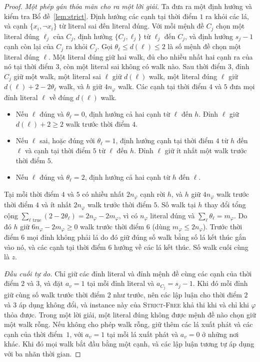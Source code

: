 \documentclass[pdflatex,sn-mathphys-num]{sn-jnl}
\theoremstyle{thmstyleone}
\theoremstyle{thmstyletwo}
\theoremstyle{thmstylethree}
\newcommand{\SFREE}{\textup{\textsc{Strict-Free}}}
\begin{document}
\begin{proof}
\emph{Một phép gán thỏa mãn cho ra một lời giải.} Ta đưa ra một định hướng và kiểm tra Bổ đề~\ref{lem:strict}. Định hướng các cạnh tại thời điểm $1$ ra khỏi các lá, và cạnh $\{x_i,\lnot x_i\}$ từ literal sai đến literal đúng. Với mỗi mệnh đề $C_j$ chọn một literal đúng $\ell_j$ của $C_j$, định hướng $\{C_j,\ell_j\}$ từ $\ell_j$ đến $C_j$, và định hướng $s_j-1$ cạnh còn lại của $C_j$ ra khỏi $C_j$. Gọi $\theta_\ell\le d(\ell)\le2$ là số mệnh đề chọn một literal đúng $\ell$. Một literal đúng giữ hai walk, đủ cho nhiều nhất hai cạnh ra của nó tại thời điểm $3$, còn một literal sai không có walk nào. Sau thời điểm $3$, đỉnh $C_j$ giữ một walk, một literal sai $\ell$ giữ $d(\ell)$ walk, một literal đúng $\ell$ giữ $d(\ell)+2-2\theta_\ell$ walk, và $h$ giữ $4n_\varphi$ walk. Các cạnh tại thời điểm $4$ và $5$ đưa mọi đỉnh literal $\ell$ về đúng $d(\ell)$ walk.
\begin{itemize}
\item Nếu $\ell$ đúng và $\theta_\ell=0$, định hướng cả hai cạnh từ $\ell$ đến $h$. Đỉnh $\ell$ giữ $d(\ell)+2\ge2$ walk trước thời điểm $4$.
\item Nếu $\ell$ sai, hoặc đúng với $\theta_\ell=1$, định hướng cạnh tại thời điểm $4$ từ $h$ đến $\ell$ và cạnh tại thời điểm $5$ từ $\ell$ đến $h$. Đỉnh $\ell$ giữ ít nhất một walk trước thời điểm $5$.
\item Nếu $\ell$ đúng và $\theta_\ell=2$, định hướng cả hai cạnh từ $h$ đến $\ell$.
\end{itemize}
Tại mỗi thời điểm $4$ và $5$ có nhiều nhất $2n_\varphi$ cạnh rời $h$, và $h$ giữ $4n_\varphi$ walk trước thời điểm $4$ và ít nhất $2n_\varphi$ walk trước thời điểm $5$. Số walk tại $h$ thay đổi tổng cộng $\sum_{\ell\text{ true}}(2-2\theta_\ell)=2n_\varphi-2m_\varphi$, vì có $n_\varphi$ literal đúng và $\sum_\ell\theta_\ell=m_\varphi$. Do đó $h$ giữ $6n_\varphi-2m_\varphi\ge0$ walk trước thời điểm $6$ (dùng $m_\varphi\le2n_\varphi$). Trước thời điểm $6$ mọi đỉnh không phải lá do đó giữ đúng số walk bằng số lá kết thúc gắn vào nó, và các cạnh tại thời điểm $6$ hướng về các lá kết thúc. Số walk cuối cùng là $z$.

\emph{Đầu cuối tự do.} Chỉ giữ các đỉnh literal và đỉnh mệnh đề cùng các cạnh của thời điểm $2$ và $3$, và đặt $a_v=1$ tại mỗi đỉnh literal và $a_{C_j}=s_j-1$. Khi đó mỗi đỉnh giữ cùng số walk trước thời điểm $2$ như trước, nên các lập luận cho thời điểm $2$ và $3$ áp dụng không đổi, và instance này của \SFREE{} khả thi khi và chỉ khi $\varphi$ thỏa được. Trong một lời giải, một literal đúng không được mệnh đề nào chọn giữ một walk rỗng. Nếu không cho phép walk rỗng, giữ thêm các lá xuất phát và các cạnh của thời điểm~$1$, với $a_v=1$ tại mỗi lá xuất phát và $a_v=0$ ở những nơi khác. Khi đó mọi walk bắt đầu bằng một cạnh, và các lập luận tương tự áp dụng với ba nhãn thời gian.
\end{proof}
\end{document}

